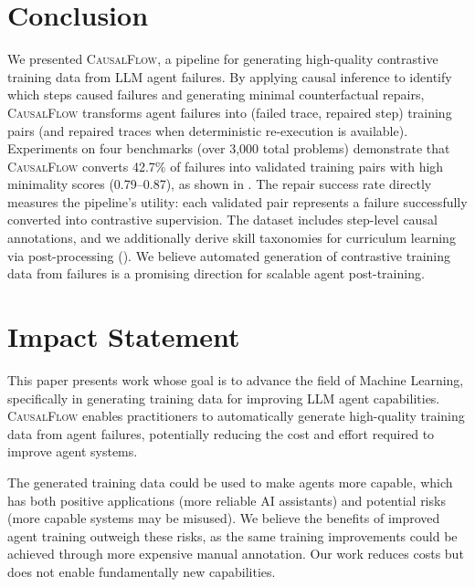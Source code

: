 \documentclass{article}
\theoremstyle{plain}
\theoremstyle{definition}
\theoremstyle{remark}
\begin{document}
\section{Conclusion}

We presented \textsc{CausalFlow}, a pipeline for generating high-quality contrastive training data from LLM agent failures. By applying causal inference to identify which steps caused failures and generating minimal counterfactual repairs, \textsc{CausalFlow} transforms agent failures into (failed trace, repaired step) training pairs (and repaired traces when deterministic re-execution is available). Experiments on four benchmarks (over 3{,}000 total problems) demonstrate that \textsc{CausalFlow} converts 42.7\% of failures into validated training pairs with high minimality scores (0.79--0.87), as shown in . The repair success rate directly measures the pipeline's utility: each validated pair represents a failure successfully converted into contrastive supervision. The dataset includes step-level causal annotations, and we additionally derive skill taxonomies for curriculum learning via post-processing (). We believe automated generation of contrastive training data from failures is a promising direction for scalable agent post-training.


\section*{Impact Statement}

This paper presents work whose goal is to advance the field of Machine Learning, specifically in generating training data for improving LLM agent capabilities. \textsc{CausalFlow} enables practitioners to automatically generate high-quality training data from agent failures, potentially reducing the cost and effort required to improve agent systems.

The generated training data could be used to make agents more capable, which has both positive applications (more reliable AI assistants) and potential risks (more capable systems may be misused). We believe the benefits of improved agent training outweigh these risks, as the same training improvements could be achieved through more expensive manual annotation. Our work reduces costs but does not enable fundamentally new capabilities.





\newpage
\appendix
\onecolumn
\end{document}
